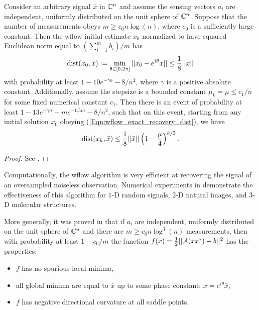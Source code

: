 \begin{theorem} 			\label{Thm:wflow_exact_recovery}
Consider an arbitrary signal $\bar{x}$ in ${\mathbb C}^n$ and assume the sensing vectors $a_i$ are independent, uniformly distributed on the unit sphere of ${\mathbb C}^n$.  Suppose that the number of measurements obeys $m \geq c_0 n \log(n)$, where $c_0$ is a sufficiently large constant.  Then the wflow initial estimate $x_0$ normalized to have squared Euclidean norm equal to $(\sum_{i=1}^m b_i)/m$ has
\begin{equation} 			\label{Eqn:wflow_exact_recovery_dist}
\operatorname{dist}(x_0, \bar{x}) := \min\limits_{\theta \in [0, 2\pi]} ||x_0 - e^{i \theta}\bar{x} || \leq \frac{1}{8}||x||
\end{equation}
with probability at least $1 - 10e^{-\gamma n} - 8/n^2$, where $\gamma$ is a positive absolute constant.  Additionally, assume the stepsize is a bounded constant $\mu_k = \mu \leq c_1/n$ for some fixed numerical constant $c_1$.  Then there is an event of probability at least $1 - 13e^{- \gamma n} - me^{-1.5m} - 8/n^2$, such that on this event, starting from any initial solution $x_0$ obeying (\ref{Eqn:wflow_exact_recovery_dist}), we have
\begin{equation} 			\label{Eqn:wflow_exact_recovery_rate}
\operatorname{dist}(x_k, \bar{x}) \leq \frac{1}{8} ||\bar{x}|| \left( 1 - \frac{\mu}{4} \right)^{k / 2}.
\end{equation}
\end{theorem}
\begin{proof}
See \cite[Section 7]{DBLP:journals/tit/CandesLS15}.
\end{proof}

Computationally, the wflow algorithm is very efficient at recovering the signal of an oversampled noiseless observation.  Numerical experiments in \cite[Section 4]{DBLP:journals/tit/CandesLS15} demonstrate the effectiveness of this algorithm for $1$-D random signals, $2$-D natural images, and $3$-D molecular structures.  


More generally, it was proved in \cite{sun2016geometric} that if $a_i$ are independent, uniformly distributed on the unit sphere of ${\mathbb C}^n$ and there are $m \geq c_0 n \log^3(n)$ measurements, then with probability at least $1-c_0/m$ the function $f(x) = \frac{1}{2}||{\mathcal A}(xx^*) - b||^2$ has the properties:

\begin{itemize} 		

\item 
$f$ has no spurious local minima,

\item
all global minima are equal to $\bar{x}$ up to some phase constant: $x = e^{i \theta}\bar{x}$,

\item
$f$ has negative directional curvature at all saddle points.

\end{itemize}

